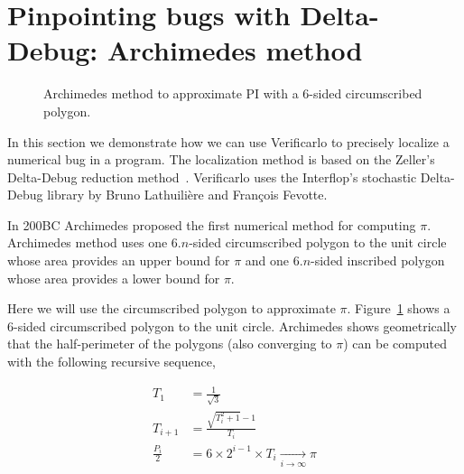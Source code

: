 \section{Pinpointing bugs with Delta-Debug: Archimedes method}

\begin{figure}[h]
  \centering
  \caption{Archimedes method to approximate PI with a 6-sided circumscribed polygon.
    \label{fig:archimedes}
  }
\end{figure}

In this section we demonstrate how we can use Verificarlo to precisely localize a numerical bug in a program. The localization method is based on the Zeller's Delta-Debug reduction method~\cite{zeller2001automated}. Verificarlo uses the Interflop's stochastic Delta-Debug library by Bruno Lathuilière and François Fevotte.

In 200BC Archimedes proposed the first numerical method for computing $\pi$.
Archimedes method uses one $6.n$-sided circumscribed polygon to the unit circle
whose area provides an upper bound for $\pi$ and one $6.n$-sided inscribed polygon
whose area provides a lower bound for $\pi$.

Here we will use the circumscribed polygon to approximate $\pi$.
Figure~\ref{fig:archimedes} shows a 6-sided circumscribed polygon to the unit
circle. Archimedes shows geometrically that the half-perimeter of the polygons (also converging to $\pi$) can be computed with the following recursive sequence,

\begin{align*}
  T_1 &= \frac{1}{\sqrt{3}} \\
  T_{i+1} &= \frac{\sqrt{T_i^2+1} - 1}{T_i} \\
  \frac{P_{i}}{2} &= 6 \times 2^{i-1} \times T_{i} \xrightarrow[i \to \infty]{} \pi
\end{align*}

